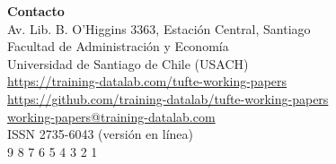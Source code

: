 \documentclass[a4paper]{../tufte-book} %
\begin{document}
\begin{fullwidth}
{\noindent \bfseries Contacto}\\
{\noindent Av. Lib. B. O'Higgins 3363, Estación Central, Santiago}\\
{\noindent Facultad de Administración y Economía}\\
{\noindent Universidad de Santiago de Chile (USACH)}\\
{\noindent {\Large \faHome} \href{https://training-datalab.com/tufte-working-papers/}{https://training-datalab.com/tufte-working-papers}}\\
{\noindent {\Large \faGithub} \href{https://github.com/training-datalab/tufte-working-papers}{https://github.com/training-datalab/tufte-working-papers}}\\
{\noindent {\Large \Letter} \href{mailto:working-papers@training-datalab.com}{working-papers@training-datalab.com}}\\

{\noindent ISSN 2735-6043 {\footnotesize (versi\'on en l\'inea)}}\\

{\footnotesize {} \hspace{1mm} 9 \hspace{1mm} \hspace{1mm} 8 \hspace{1mm} 7 \hspace{1mm} 6 \hspace{1mm} 5 \hspace{1mm} 4 \hspace{1mm} 3 \hspace{1mm} 2 \hspace{1mm} 1}
\end{fullwidth}
\end{document}
